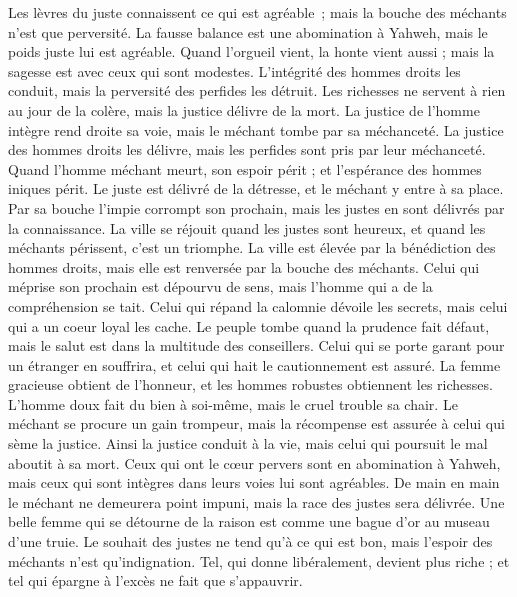 \begin{multicols}{2}
Les lèvres du juste connaissent ce qui est agréable ; mais la bouche des méchants n’est que perversité.
\VerseOne{}La fausse balance est une abomination à Yahweh, mais le poids juste lui est agréable.
Quand l'orgueil vient, la honte vient aussi ; mais la sagesse est avec ceux qui sont modestes.
L’intégrité des hommes droits les conduit, mais la perversité des perfides les détruit.
Les richesses ne servent à rien au jour de la colère, mais la justice délivre de la mort.
La justice de l'homme intègre rend droite sa voie, mais le méchant tombe par sa méchanceté.
La justice des hommes droits les délivre, mais les perfides sont pris par leur méchanceté.
Quand l’homme méchant meurt, son espoir périt ; et l'espérance des hommes iniques périt.
Le juste est délivré de la détresse, et le méchant y entre à sa place.
Par sa bouche l’impie corrompt son prochain, mais les justes en sont délivrés par la connaissance.
La ville se réjouit quand les justes sont heureux, et quand les méchants périssent, c’est un triomphe.
La ville est élevée par la bénédiction des hommes droits, mais elle est renversée par la bouche des méchants.
Celui qui méprise son prochain est dépourvu de sens, mais l'homme qui a de la compréhension se tait.
Celui qui répand la calomnie dévoile les secrets, mais celui qui a un coeur loyal les cache.
Le peuple tombe quand la prudence fait défaut, mais le salut est dans la multitude des conseillers.
Celui qui se porte garant pour un étranger en souffrira, et celui qui hait le cautionnement est assuré.
La femme gracieuse obtient de l'honneur, et les hommes robustes obtiennent les richesses.
L'homme doux fait du bien à soi-même, mais le cruel trouble sa chair.
Le méchant se procure un gain trompeur, mais la récompense est assurée à celui qui sème la justice.
Ainsi la justice conduit à la vie, mais celui qui poursuit le mal aboutit à sa mort.
Ceux qui ont le cœur pervers sont en abomination à Yahweh, mais ceux qui sont intègres dans leurs voies lui sont agréables.
De main en main le méchant ne demeurera point impuni, mais la race des justes sera délivrée.
Une belle femme qui se détourne de la raison est comme une bague d'or au museau d'une truie.
Le souhait des justes ne tend qu’à ce qui est bon, mais l'espoir des méchants n'est qu'indignation.
Tel, qui donne libéralement, devient plus riche ; et tel qui épargne à l’excès ne fait que s’appauvrir.

\end{multicols}
